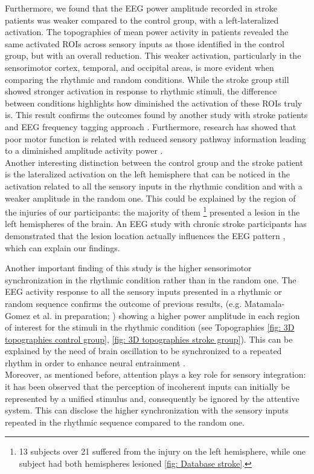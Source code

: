 Furthermore, we found that the EEG power amplitude recorded in stroke patients was weaker compared to the control group, with a left-lateralized activation. The topographies of mean power activity in patients revealed the same activated ROIs across sensory inputs as those identified in the control group, but with an overall reduction. This weaker activation, particularly in the sensorimotor cortex, temporal, and occipital areas, is more evident when comparing the rhythmic and random conditions. While the stroke group still showed stronger activation in response to rhythmic stimuli, the difference between conditions highlights how diminished the activation of these ROIs truly is. This result confirms the outcomes found by another study with stroke patients and EEG frequency tagging approach \parencite{Nozaradan_2017}. Furthermore, research has showed that poor motor function is related with reduced sensory pathway information leading to a diminished amplitude activity power \parencite{Campfens_2015}. \\
Another interesting distinction between the control group and the stroke patient is the lateralized activation on the left hemisphere that can be noticed in the activation related to all the sensory inputs in the rhythmic condition and with a weaker amplitude in the random one. This could be explained by the region of the injuries of our participants: the majority of them \footnote{13 subjects over 21 suffered from the injury on the left hemisphere, while one subject had both hemispheres lesioned \ref{fig: Database stroke}.} presented a lesion in the left hemispheres of the brain. An EEG study with chronic stroke participants has demonstrated that the lesion location actually influences the EEG pattern \parencite{Park_2016}, which can explain our findings. 

Another important finding of this study is the higher sensorimotor synchronization in the rhythmic condition rather than in the random one. The EEG activity response to all the sensory inputs presented in a rhythmic or random sequence confirms the outcome of previous results, (e.g. Matamala-Gomez et al. in preparation; \cite{Haegens_2018}) showing a higher power amplitude in each region of interest for the stimuli in the rhythmic condition (see Topographies \ref{fig: 3D topographies control group}, \ref{fig: 3D topographies stroke group}). This can be explained by the need of brain oscillation to be synchronized to a repeated rhythm in order to enhance neural entrainment \parencite{Rosso_2023}. \\
Moreover, as mentioned before, attention plays a key role for sensory integration: it has been observed that the perception of incoherent inputs can initially be represented by a unified stimulus \parencite{Bergam_1990} and, consequently be ignored by the attentive system. This can disclose the higher synchronization with the sensory inputs repeated in the rhythmic sequence compared to the random one. 

